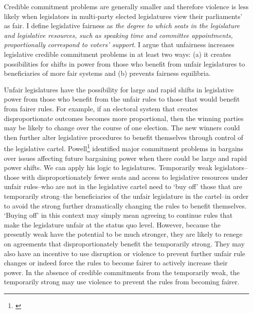 \documentclass[a4paper]{article}\usepackage[]{graphicx}\usepackage[]{color}
\begin{document}
Credible commitment problems are generally smaller and therefore violence is less likely when legislators in multi-party elected legislatures view their parliaments' as fair. I define legislative fairness as \emph{the degree to which seats in the legislature and legislative resources, such as speaking time and committee appointments, proportionally correspond to voters' support}. I argue that unfairness increases legislative credible commitment problems in at least two ways: (a) it creates possibilities for shifts in power from those who benefit from unfair legislatures to beneficiaries of more fair systems and (b) prevents fairness equilibria.

Unfair legislatures have the possibility for large and rapid shifts in legislative power from those who benefit from the unfair rules to those that would benefit from fairer rules. For example, if an electoral system that creates disproportionate outcomes becomes more proportional, then the winning parties may be likely to change over the course of one election. The new winners could then further alter legislative procedures to benefit themselves through control of the legislative cartel. Powell\footnote{\citealt{Powell2004,Powell2006}} identified major commitment problems in bargains over issues affecting future bargaining power when there could be large and rapid power shifts. We can apply his logic to legislatures. Temporarily weak legislators--those with disproportionately fewer seats and access to legislative resources under unfair rules--who are not in the legislative cartel need to `buy off' those that are temporarily strong--the beneficiaries of the unfair legislature in the cartel--in order to avoid the strong further dramatically changing the rules to benefit themselves. `Buying off' in this context may simply mean agreeing to continue rules that make the legislature unfair at the status quo level. However, because the presently weak have the potential to be much stronger, they are likely to renege on agreements that disproportionately benefit the temporarily strong. They may also have an incentive to use disruption or violence to prevent further unfair rule changes or indeed force the rules to become fairer to actively increase their power. In the absence of credible commitments from the temporarily weak, the temporarily strong may use violence to prevent the rules from becoming fairer.
\end{document}
